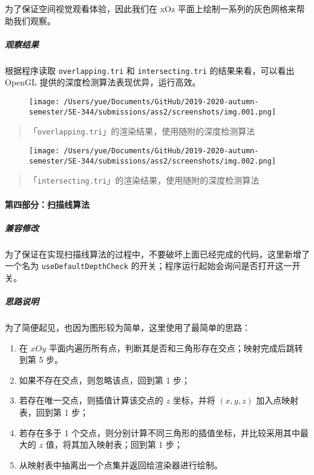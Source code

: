 \documentclass[
]{article}
\begin{document}
为了保证空间视觉观看体验，因此我们在 xOz
平面上绘制一系列的灰色网格来帮助我们观察。

\hypertarget{header-n78}{%
\subparagraph{观察结果}\label{header-n78}}

根据程序读取 \texttt{overlapping.tri} 和 \texttt{intersecting.tri}
的结果来看，可以看出 OpenGL 提供的深度检测算法表现优异，运行高效。

\begin{figure}
\centering
\texttt{[image: /Users/yue/Documents/GitHub/2019-2020-autumn-semester/SE-344/submissions/ass2/screenshots/img.001.png]}
\caption{}
\end{figure}

\begin{quote}
「\texttt{overlapping.tri}」的渲染结果，使用随附的深度检测算法
\end{quote}

\begin{figure}
\centering
\texttt{[image: /Users/yue/Documents/GitHub/2019-2020-autumn-semester/SE-344/submissions/ass2/screenshots/img.002.png]}
\caption{}
\end{figure}

\begin{quote}
「\texttt{intersecting.tri}」的渲染结果，使用随附的深度检测算法
\end{quote}

\hypertarget{header-n86}{%
\paragraph{第四部分：扫描线算法}\label{header-n86}}

\hypertarget{header-n87}{%
\subparagraph{兼容修改}\label{header-n87}}

为了保证在实现扫描线算法的过程中，不要破坏上面已经完成的代码，这里新增了一个名为
\texttt{useDefaultDepthCheck}
的开关；程序运行起始会询问是否打开这一开关。

\hypertarget{header-n89}{%
\subparagraph{思路说明}\label{header-n89}}

为了简便起见，也因为图形较为简单，这里使用了最简单的思路：

\begin{enumerate}
\def\labelenumi{\arabic{enumi}.}
\item
  在 \(xOy\)
  平面内遍历所有点，判断其是否和三角形存在交点；映射完成后跳转到第 5
  步。
\item
  如果不存在交点，则忽略该点，回到第 1 步；
\item
  若存在唯一交点，则插值计算该交点的 \(z\) 坐标，并将 \((x, y, z)\)
  加入点映射表，回到第 1 步；
\item
  若存在多于 1
  个交点，则分别计算不同三角形的插值坐标，并比较采用其中最大的 \(z\)
  值，将其加入映射表；回到第 1 步；
\item
  从映射表中抽离出一个点集并返回给渲染器进行绘制。
\end{enumerate}
\end{document}
